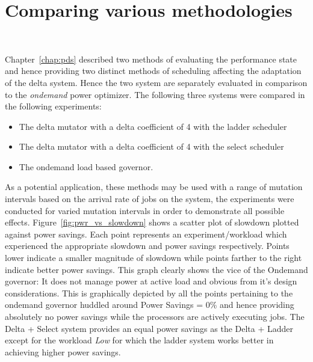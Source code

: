 \section{Comparing various methodologies}~\label{sec:compare}

Chapter~\ref{chap:pds} described two methods of evaluating the performance state and hence
providing two distinct methods of scheduling affecting the adaptation of the delta system.
Hence the two system are separately evaluated in comparison to the \textit{ondemand}
power optimizer. The following three systems were compared in the following experiments:
\begin{itemize}
\item The delta mutator with a delta coefficient of 4 with the ladder scheduler
\item The delta mutator with a delta coefficient of 4 with the select scheduler
\item The ondemand load based governor.
\end{itemize}

As a potential application, these methods may be used with a range of mutation intervals based
on the arrival rate of jobs on the system, the experiments were conducted for varied mutation intervals
in order to demonstrate all possible effects.
Figure~\ref{fig:pwr_vs_slowdown} shows a scatter plot of slowdown plotted against power savings. Each point
represents an experiment/workload which experienced the appropriate slowdown and power savings respectively. 
Points lower indicate a smaller magnitude of slowdown while points farther to the right indicate better power
savings. This graph clearly shows the vice of the Ondemand governor: It does not manage power at active
load and obvious from it's design considerations. This is graphically depicted by all the points pertaining
to the ondemand governor huddled around Power Savings = 0\% and hence providing absolutely no power savings
while the processors are actively executing jobs. The Delta + Select system provides an equal power savings
as the Delta + Ladder except for the workload \textit{Low} for which the ladder system works better in achieving
higher power savings.

